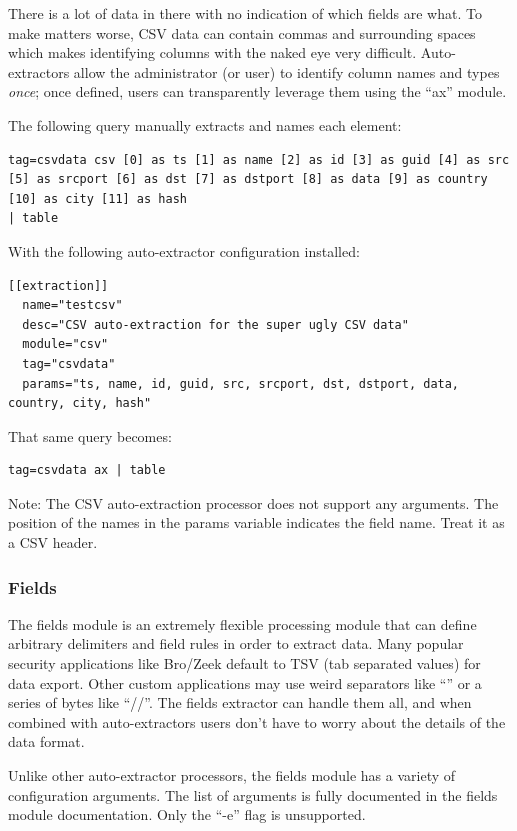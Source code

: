 There is a lot of data in there with no indication of which fields are
what. To make matters worse, CSV data can contain commas and surrounding
spaces which makes identifying columns with the naked eye very
difficult. Auto-extractors allow the administrator (or user) to identify column
names and types \emph{once}; once defined, users can transparently leverage
them using the ``ax'' module.

The following query manually extracts and names each element:

\begin{Verbatim}[breaklines=true]
tag=csvdata csv [0] as ts [1] as name [2] as id [3] as guid [4] as src 
[5] as srcport [6] as dst [7] as dstport [8] as data [9] as country 
[10] as city [11] as hash
| table
\end{Verbatim}

With the following auto-extractor configuration installed:

\begin{Verbatim}[breaklines=true]
[[extraction]]
  name="testcsv"
  desc="CSV auto-extraction for the super ugly CSV data"
  module="csv"
  tag="csvdata"
  params="ts, name, id, guid, src, srcport, dst, dstport, data, country, city, hash"
\end{Verbatim}

That same query becomes:

\begin{Verbatim}[breaklines=true]
tag=csvdata ax | table
\end{Verbatim}

Note: The CSV auto-extraction processor does not support any
arguments. The position of the names in the params variable indicates
the field name. Treat it as a CSV header.

\subsubsection{Fields}

The fields module is an extremely flexible processing module that can
define arbitrary delimiters and field rules in order to extract data.
Many popular security applications like Bro/Zeek default to TSV (tab
separated values) for data export. Other custom applications may use
weird separators like ``\textbar{}'' or a series of bytes like ``//''. The
fields extractor can handle them all, and when combined with
auto-extractors users don't have to worry about the details of the data
format.

Unlike other auto-extractor processors, the fields module has a variety
of configuration arguments. The list of arguments is fully documented in
the fields module documentation. Only the ``-e'' flag is unsupported.

